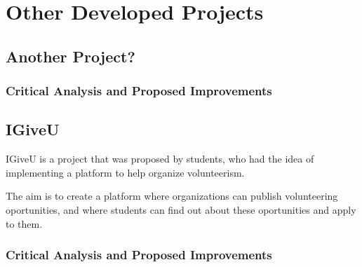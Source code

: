 

\chapter{Other Developed Projects}
\label{ch:projects}

\section{Another Project?}

\subsection{Critical Analysis and Proposed Improvements}

\section{IGiveU}

IGiveU is a project that was proposed by students, who had the idea of implementing a platform to help organize volunteerism.

The aim is to create a platform where organizations can publish volunteering oportunities, and where students can find out about these oportunities and apply to them.

\subsection{Critical Analysis and Proposed Improvements}
